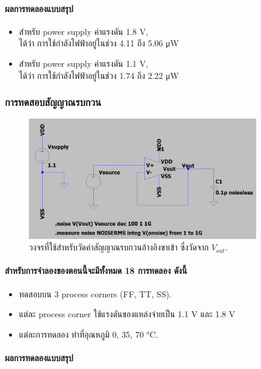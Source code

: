 \documentclass[a4paper, 11pt, oneside]{book} %
\begin{document}
\paragraph{ผลการทดลองแบบสรุป}

\begin{itemize}
    \item สำหรับ power supply ค่าแรงดัน 1.8 V, \\ได้ว่า การใช้กำลังไฟฟ้าอยู่ในช่วง 4.11 ถึง 5.06 \si{\micro W}
    \item สำหรับ power supply ค่าแรงดัน 1.1 V, \\ได้ว่า การใช้กำลังไฟฟ้าอยู่ในช่วง 1.74 ถึง 2.22 \si{\micro W}
\end{itemize}

\subsubsection{การทดสอบสัญญาณรบกวน}

\begin{figure}[h]
    \centering
    \includegraphics[width = 10cm]{measure-noise}
    \caption{วงจรที่ใช้สำหรับวัดค่าสัญญาณรบกวนอ้างอิงขาเข้า ซึ่งวัดจาก $V_{out}$.}
    \label{measure-noise}
\end{figure}

\paragraph{สำหรับการจำลองของตอนนี้จะมีทั้งหมด 18 การทดลอง ดังนี้}

\begin{itemize}
    \item ทดสอบบน 3 process corners (FF, TT, SS).
    \item แต่ละ process corner ใช้แรงดันของแหล่งจ่ายเป็น 1.1 V และ 1.8 V
    \item แต่ละการทดลอง ทำที่อุณหภูมิ 0, 35, 70 \si{\degreeCelsius}.
\end{itemize}

\paragraph{ผลการทดลองแบบสรุป}
\end{document}
